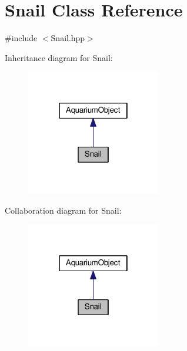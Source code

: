 \hypertarget{class_snail}{}\section{Snail Class Reference}
\label{class_snail}


{\ttfamily \#include $<$Snail.\+hpp$>$}



Inheritance diagram for Snail\+:
\nopagebreak
\begin{figure}[H]
\begin{center}
\leavevmode
\includegraphics[width=166pt]{class_snail__inherit__graph}
\end{center}
\end{figure}


Collaboration diagram for Snail\+:
\nopagebreak
\begin{figure}[H]
\begin{center}
\leavevmode
\includegraphics[width=166pt]{class_snail__coll__graph}
\end{center}
\end{figure}
